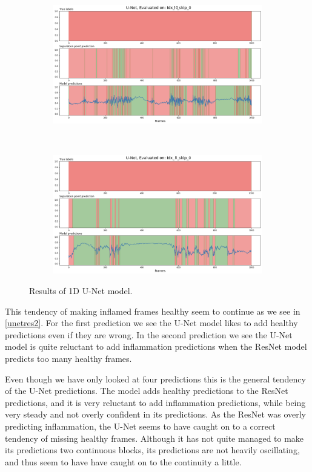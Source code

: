 \begin{figure}[H]
	\centering
	\begin{subfigure}{\linewidth}
		\centering
		\includegraphics[width=\linewidth]{Materials/Results/UNet/unet3}
	\end{subfigure}
	\\
	\begin{subfigure}{\linewidth}
		\centering
		\includegraphics[width=\linewidth]{Materials/Results/UNet/unet4}
	\end{subfigure}
	\caption{Results of 1D U-Net model.}
	\label{unetres2}
\end{figure}

This tendency of making inflamed frames healthy seem to continue as we see in \autoref{unetres2}. For the first prediction we see the U-Net model likes to add healthy predictions even if they are wrong. In the second prediction we see the U-Net model is quite reluctant to add inflammation predictions when the ResNet model predicts too many healthy frames.

Even though we have only looked at four predictions this is the general tendency of the U-Net predictions. The model adds healthy predictions to the ResNet predictions, and it is very reluctant to add inflammation predictions, while being very steady and not overly confident in its predictions. As the ResNet was overly predicting inflammation, the U-Net seems to have caught on to a correct tendency of missing healthy frames. Although it has not quite managed to make its predictions two continuous blocks, its predictions are not heavily oscillating, and thus seem to have have caught on to the continuity a little.